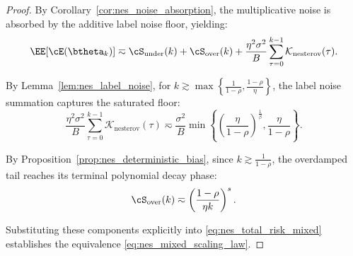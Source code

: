 \documentclass[11pt]{article}
\newcommand{\nesterov}{\mathrm{nesterov}}
\begin{document}
\begin{proof}
By Corollary~\ref{cor:nes_noise_absorption}, the multiplicative noise is absorbed by the additive label noise floor, yielding:
\begin{equation}
\label{eq:nes_total_risk_mixed}
    \EE[\cE(\btheta_k)] 
    \eqsim 
    \cS_{\mathrm{under}}(k) + \cS_{\mathrm{over}}(k) + \frac{\eta^2\sigma^2}{B}\sum_{\tau=0}^{k-1}\mathcal{K}_{\nesterov}(\tau).
\end{equation}

By Lemma~\ref{lem:nes_label_noise}, for $k \gtrsim \max\left\{\frac{1}{1-\rho}, \frac{1-\rho}{\eta}\right\}$, the label noise summation captures the saturated floor:
\begin{equation*}
    \frac{\eta^2\sigma^2}{B}\sum_{\tau=0}^{k-1}\mathcal{K}_{\nesterov}(\tau) 
    \eqsim 
    \frac{\sigma^2}{B} \min\left\{ \left(\frac{\eta}{1-\rho}\right)^{\frac1\beta}, \frac{\eta}{1-\rho} \right\}.
\end{equation*}

By Proposition~\ref{prop:nes_deterministic_bias}, since $k \gtrsim \frac{1}{1-\rho}$, the overdamped tail reaches its terminal polynomial decay phase:
\begin{equation*}
    \cS_{\mathrm{over}}(k) \eqsim \left(\frac{1-\rho}{\eta k}\right)^s.
\end{equation*}

Substituting these components explicitly into \eqref{eq:nes_total_risk_mixed} establishes the equivalence \eqref{eq:nes_mixed_scaling_law}.
\end{proof}








\end{document}
